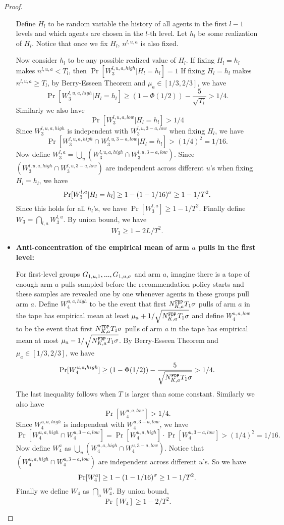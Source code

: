 \begin{proof}
\begin{itemize}
Define $H_l$ to be random variable the history of all agents in the first $l-1$ levels and which agents are chosen in the $l$-th level. Let $h_l$ be some realization of $H_l$. Notice that once we fix $H_l$, $n^{l,u,a}$ is also fixed. 

Now consider $h_l$ to be any possible realized value of $H_l$. If fixing $H_l= h_l$ makes $n^{l,u,a}<T_l$, then $\Pr[W_3^{l,u,a,high} |H_l = h_l]=1$  If fixing $H_l = h_l$ makes $n^{l,u,a} \geq T_l$, by Berry-Esseen Theorem and $\mu_a \in [1/3,2/3]$, we have
\[
\Pr[W_3^{l,u,a,high}|H_l = h_l] \geq (1-\Phi(1/2)) - \frac{5}{\sqrt{T_l}} > 1/4.
\]
Similarly we also have
\[
\Pr[W_3^{l,u,a,low}|H_l = h_l]  > 1/4
\]
Since $W_3^{l,u,a,high}$ is independent with $W_3^{l,u,3-a,low}$ when fixing $H_l$, we have
\[
\Pr[ W_3^{l,u,a,high} \cap W_3^{l,u,3-a,low}|H_l = h_l]  > (1/4)^2 = 1/16.
\]
Now define $W_3^{l,a} = \bigcup_u (W_3^{l,u,a,high} \cap W_3^{l,u,3-a,low})$. Since  $(W_3^{l,u,a,high} \cap W_3^{l,u,3-a,low})$ are independent across different $u$'s when fixing $H_l=h_l$, we have
\[
\Pr[W_3^{l,a}|H_l= h_l] \geq 1- (1-1/16)^\sigma \geq 1 - 1/T^2.
\]
Since this holds for all $h_l$'s, we have $\Pr[W_3^{l,a}] \geq 1-1/T^2$. Finally define $W_3 = \bigcap_{l,a} W_3^{l,a}$. By union bound, we have
\[
W_3 \geq 1 - 2L/T^2.
\]

\item \textbf{Anti-concentration of the empirical mean of arm $a$ pulls in the first level:}

For first-level groups $G_{1,u,1},...,G_{1,u,\sigma}$ and arm $a$, imagine there is a tape of enough arm $a$ pulls sampled before the recommendation policy starts and these samples are revealed one by one whenever agents in these groups pull arm $a$. Define $W_4^{u,a,high}$  to be the event that first $N^\mathtt{FDP}_{K,a} T_1 \sigma$ pulls of arm $a$ in the tape has empirical mean at least $\mu_a + 1/\sqrt{N^\mathtt{FDP}_{K,a} T_1 \sigma}$ and define $W_4^{u,a,low}$  to be the event that first $N^\mathtt{FDP}_{K,a} T_1\sigma$ pulls of arm $a$ in the tape has empirical mean at most $\mu_a - 1/\sqrt{N^\mathtt{FDP}_{K,a} T_1\sigma }$. By Berry-Esseen Theorem and $\mu_a \in [1/3,2/3]$, we have
\[
\Pr[W_4^{u,a,high}] \geq (1-\Phi(1/2)) - \frac{5}{\sqrt{N^\mathtt{FDP}_{K,a} T_1\sigma}} > 1/4.
\]
The last inequality follows when $T$ is larger than some constant.
Similarly we also have 
\[
\Pr[W_4^{u,a,low}] > 1/4.
\]
Since $W_4^{u,a,high}$ is independent with $W_4^{u,3-a,low}$, we have
\[
\Pr[W_4^{u,a,high} \cap W_4^{u,3-a,low}] =\Pr[W_4^{u,a,high}] \cdot  \Pr[W_4^{u,3-a,low}]>(1/4)^2 = 1/16.
\]
Now define $W^{a}_4$ as $\bigcup_u (W_4^{u,a,high} \cap W_4^{u,3-a,low})$. Notice that $(W_4^{u,a,high} \cap W_4^{u,3-a,low})$ are independent across different $u$'s. So we have
\[
\Pr[W^{a}_4] \geq 1- (1-1/16)^\sigma \geq 1 -1/T^2.
\]
Finally we define $W_4$ as $\bigcap_{a} W^{a}_4$. By union bound,
\[
\Pr[W_4] \geq 1- 2/T^2.
\]
\end{itemize}


\end{proof}
